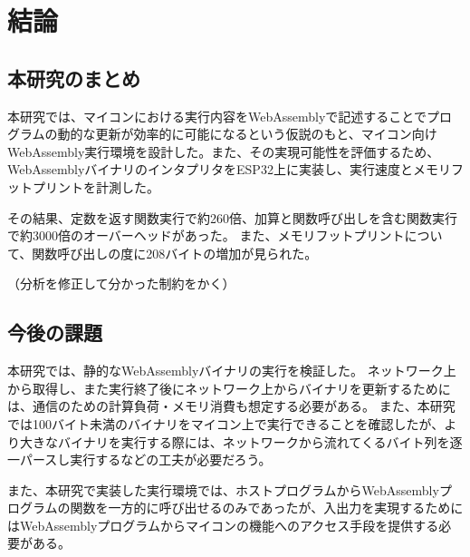 \chapter{結論}
\label{chap:conclusion}

\section{本研究のまとめ}
\label{section:conclusion}

本研究では、マイコンにおける実行内容をWebAssemblyで記述することでプログラムの動的な更新が効率的に可能になるという仮説のもと、マイコン向けWebAssembly実行環境を設計した。また、その実現可能性を評価するため、WebAssemblyバイナリのインタプリタをESP32上に実装し、実行速度とメモリフットプリントを計測した。

その結果、定数を返す関数実行で約260倍、加算と関数呼び出しを含む関数実行で約3000倍のオーバーヘッドがあった。
また、メモリフットプリントについて、関数呼び出しの度に208バイトの増加が見られた。

（分析を修正して分かった制約をかく）

\section{今後の課題}

本研究では、静的なWebAssemblyバイナリの実行を検証した。
ネットワーク上から取得し、また実行終了後にネットワーク上からバイナリを更新するためには、通信のための計算負荷・メモリ消費も想定する必要がある。
また、本研究では100バイト未満のバイナリをマイコン上で実行できることを確認したが、より大きなバイナリを実行する際には、ネットワークから流れてくるバイト列を逐一パースし実行するなどの工夫が必要だろう。

また、本研究で実装した実行環境では、ホストプログラムからWebAssemblyプログラムの関数を一方的に呼び出せるのみであったが、入出力を実現するためにはWebAssemblyプログラムからマイコンの機能へのアクセス手段を提供する必要がある。
